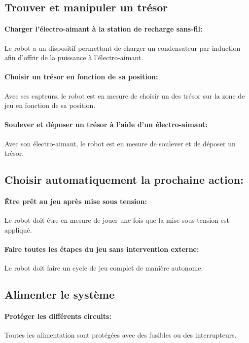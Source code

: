 \subsection{Trouver et manipuler un trésor}

\paragraph{Charger l'électro-aimant à la station de recharge sans-fil:}
Le robot a un dispositif permettant de charger un condensateur par induction afin d'offrir de la puissance à l'électro-aimant.

\paragraph{Choisir un trésor en fonction de sa position:}
Avec ses capteurs, le robot est en mesure de choisir un des trésor sur la zone de jeu en fonction de sa position.

\paragraph{Soulever et déposer un trésor à l'aide d'un électro-aimant:}
Avec son électro-aimant, le robot est en mesure de soulever et de déposer un trésor.

\subsection{Choisir automatiquement la prochaine action:}

\paragraph{Être prêt au jeu après mise sous tension:}
Le robot doit être en mesure de jouer une fois que la mise sous tension est appliqué.

\paragraph{Faire toutes les étapes du jeu sans intervention externe:}
Le robot doit faire un cycle de jeu complet de manière autonome.

\subsection{Alimenter le système}

\paragraph{Protéger les différents circuits:}
Toutes les alimentation sont protégées avec des fusibles ou des interrupteurs.


